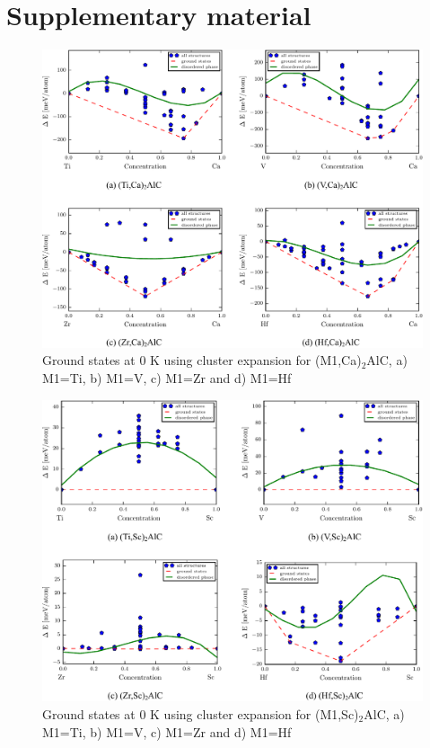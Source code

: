 \documentclass[preprint,amsmath,amssymb,aps, prb,showkeys]{revtex4-1}
\begin{document}
\section{Supplementary material}
\label{sec:app}

\begin{figure}[h!]
\centering
\includegraphics[scale=0.5]{figure_17.pdf}
\caption{Ground states at 0 K using cluster expansion for (M1,Ca)$_2$AlC, a) M1=Ti, b) M1=V, c) M1=Zr and d) M1=Hf }
\end{figure}

\begin{figure}
\centering
\includegraphics[scale=0.5]{figure_18.pdf} 
\caption{Ground states at 0 K using cluster expansion for (M1,Sc)$_2$AlC, a) M1=Ti, b) M1=V, c) M1=Zr and d) M1=Hf }
\end{figure}
\end{document}
